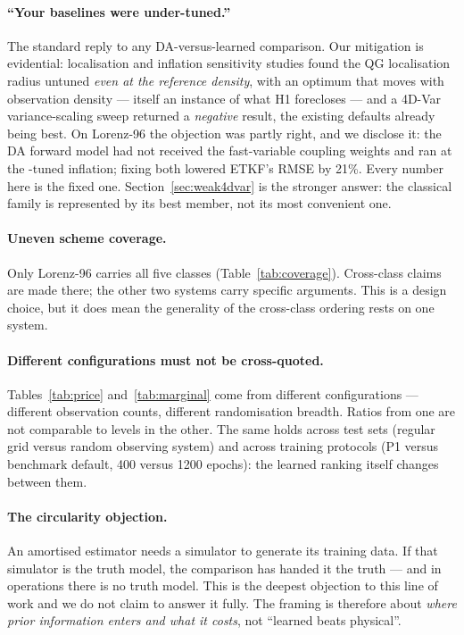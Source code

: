 \paragraph{``Your baselines were under-tuned.''}
The standard reply to any DA-versus-learned comparison. Our mitigation is
evidential: localisation and inflation sensitivity studies found the QG
localisation radius untuned \emph{even at the reference density}, with an optimum
that moves with observation density --- itself an instance of what H1 forecloses
--- and a 4D-Var variance-scaling sweep returned a \emph{negative} result, the
existing defaults already being best. On Lorenz-96 the objection was partly
right, and we disclose it: the DA forward model had not received the
fast-variable coupling weights and \Sz{} ran at the \So{}-tuned inflation; fixing
both lowered ETKF's \Sz{} RMSE by 21\%. Every number here is the fixed one.
Section~\ref{sec:weak4dvar} is the stronger answer: the classical family is
represented by its best member, not its most convenient one.

\paragraph{Uneven scheme coverage.}
Only Lorenz-96 carries all five classes (Table~\ref{tab:coverage}). Cross-class
claims are made there; the other two systems carry specific arguments. This is a
design choice, but it does mean the generality of the cross-class ordering rests
on one system.

\paragraph{Different configurations must not be cross-quoted.}
Tables~\ref{tab:price} and~\ref{tab:marginal} come from different configurations
--- different observation counts, different randomisation breadth. Ratios from
one are not comparable to levels in the other. The same holds across test sets
(regular grid versus random observing system) and across training protocols
(P1 versus benchmark default, 400 versus 1200 epochs): the learned ranking itself
changes between them.

\paragraph{The circularity objection.}
An amortised estimator needs a simulator to generate its training data. If that
simulator is the truth model, the comparison has handed it the truth --- and in
operations there is no truth model. This is the deepest objection to this line of
work and we do not claim to answer it fully. The framing is therefore about
\emph{where prior information enters and what it costs}, not ``learned beats
physical''.

